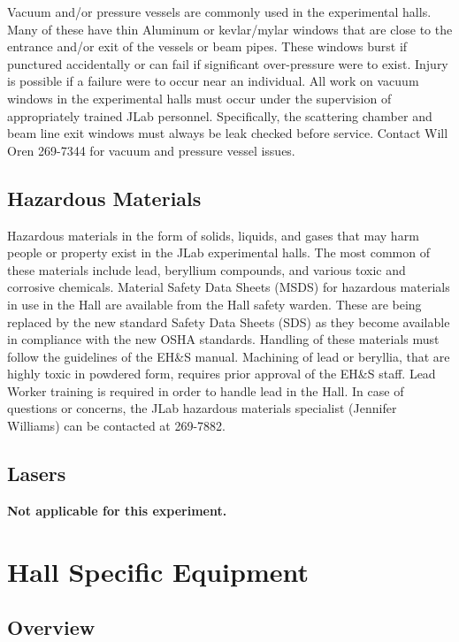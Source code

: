 \documentclass[11pt]{report}
\begin{document}
	Vacuum and/or pressure vessels are commonly used in the experimental halls. Many 
of these have thin Aluminum or kevlar/mylar windows that are close to the entrance 
and/or exit of the vessels or beam pipes. These windows burst if punctured accidentally 
or can fail if significant over-pressure were to exist. Injury is possible if a failure 
were to occur near an individual. All work on vacuum windows in the experimental halls 
must occur under the supervision of appropriately trained JLab personnel. Specifically, 
the scattering chamber and beam line exit windows must always be leak checked before service. 
Contact Will Oren 269-7344 for vacuum and pressure vessel issues.

\section{Hazardous Materials}

	Hazardous materials in the form of solids, liquids, and gases that may harm people 
or property exist in the JLab experimental halls. The most common of these materials include 
lead, beryllium compounds, and various toxic and corrosive chemicals. 
Material Safety Data Sheets (MSDS) for hazardous materials 
in use in the Hall are available from the Hall safety warden.  These are being replaced by the new standard
Safety Data Sheets (SDS) as they become available in compliance with the new OSHA standards.    Handling of these materials 
must follow the guidelines of the EH\&S manual. Machining of lead or beryllia, that 
are highly toxic in powdered form, requires prior approval of the EH\&S staff. 
Lead Worker training is required in order to handle lead in the Hall. 
In case of questions or concerns, the JLab hazardous materials specialist (Jennifer Williams) can be contacted at 269-7882.

\section{Lasers}

	{\bf Not applicable for this experiment.}
%
%
\chapter{Hall Specific Equipment}

\section{Overview}
\indent
\end{document}
